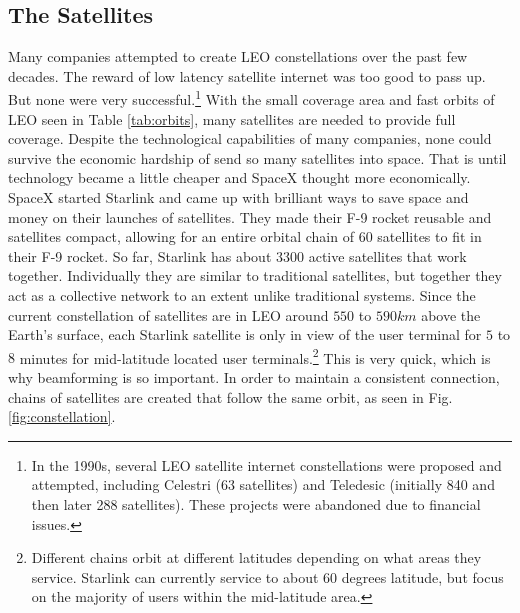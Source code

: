 \documentclass[10pt]{article}
\begin{document}
\subsection{The Satellites}
\label{starlink_satellites}

Many companies attempted to create LEO constellations over the past few decades. The reward of low latency satellite internet was too good to pass up. But none were very successful.\footnote{In the 1990s, several LEO satellite internet constellations were proposed and attempted, including Celestri (63 satellites) and Teledesic (initially 840 and then later 288 satellites). These projects were abandoned due to financial issues.} With the small coverage area and fast orbits of LEO seen in Table \ref{tab:orbits}, many satellites are needed to provide full coverage. Despite the technological capabilities of many companies, none could survive the economic hardship of send so many satellites into space. That is until technology became a little cheaper and SpaceX thought more economically. SpaceX started Starlink and came up with brilliant ways to save space and money on their launches of satellites. They made their F-9 rocket reusable and satellites compact, allowing for an entire orbital chain of $60$ satellites to fit in their F-9 rocket. So far, Starlink has about $3300$ active satellites that work together. Individually they are similar to traditional satellites, but together they act as a collective network to an extent unlike traditional systems. Since the current constellation of  satellites are in LEO around $550$ to $590\si{km}$ above the Earth's surface, each Starlink satellite is only in view of the user terminal for $5$ to $8$ minutes for mid-latitude located user terminals.\footnote{Different chains orbit at different latitudes depending on what areas they service. Starlink can currently service to about $60$ degrees latitude, but focus on the majority of users within the mid-latitude area.} This is very quick, which is why beamforming is so important. In order to maintain a consistent connection, chains of satellites are created that follow the same orbit, as seen in Fig. \ref{fig:constellation}. 
\end{document}
